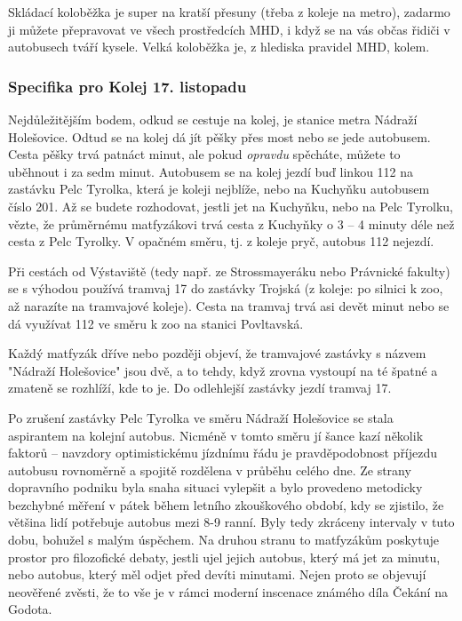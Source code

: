 Skládací koloběžka je super na kratší přesuny (třeba z koleje na metro), zadarmo
ji můžete přepravovat ve všech prostředcích MHD, i když se na vás občas řidiči v
autobusech tváří kysele. Velká koloběžka je, z hlediska pravidel MHD, kolem.


\subsubsection{Specifika pro Kolej 17. listopadu}

Nejdůležitějším bodem, odkud se cestuje na kolej, je stanice metra Nádraží
Holešovice. Odtud se na kolej dá jít pěšky přes most nebo se jede autobusem.
Cesta pěšky trvá patnáct minut, ale pokud \textit{opravdu} spěcháte, můžete to
uběhnout i za sedm minut. Autobusem se na kolej jezdí buď linkou 112 na zastávku
Pelc Tyrolka, která je koleji nejblíže, nebo na Kuchyňku autobusem číslo 201. Až
se budete rozhodovat, jestli jet na Kuchyňku, nebo na Pelc Tyrolku, vězte, že
průměrnému matfyzákovi trvá cesta z Kuchyňky o 3 – 4 minuty déle než cesta z
Pelc Tyrolky. V opačném směru, tj. z koleje pryč, autobus 112 nejezdí.

Při cestách od Výstaviště (tedy např. ze Strossmayeráku nebo Právnické fakulty)
se s výhodou používá tramvaj 17 do zastávky Trojská (z koleje: po silnici k zoo,
až narazíte na tramvajové koleje). Cesta na tramvaj trvá asi devět minut nebo se
dá využívat 112 ve směru k zoo na stanici Povltavská.

Každý matfyzák dříve nebo později objeví, že tramvajové zastávky s názvem
"Nádraží Holešovice" jsou dvě, a to tehdy, když zrovna vystoupí na té špatné a
zmateně se rozhlíží, kde to je. Do odlehlejší zastávky jezdí tramvaj 17.


Po zrušení zastávky Pelc Tyrolka ve směru Nádraží Holešovice se stala aspirantem
na kolejní autobus. Nicméně v tomto směru jí šance kazí několik faktorů –
navzdory optimistickému jízdnímu řádu je pravděpodobnost příjezdu autobusu
rovnoměrně a spojitě rozdělena v průběhu celého dne. Ze strany dopravního
podniku byla snaha situaci vylepšit a bylo provedeno metodicky bezchybné měření
v pátek během letního zkouškového období, kdy se zjistilo, že většina lidí
potřebuje autobus mezi 8-9 ranní. Byly tedy zkráceny intervaly v tuto dobu,
bohužel s malým úspěchem. Na druhou stranu to matfyzákům poskytuje prostor pro
filozofické debaty, jestli ujel jejich autobus, který má jet za minutu, nebo
autobus, který měl odjet před devíti minutami. Nejen proto se objevují neověřené
zvěsti, že to vše je v rámci moderní inscenace známého díla Čekání na Godota.


